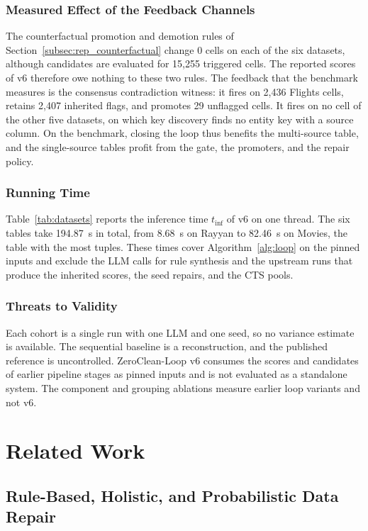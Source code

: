 \documentclass[conference]{IEEEtran}
\begin{document}
\subsubsection{Measured Effect of the Feedback Channels}
The counterfactual promotion and demotion rules of Section~\ref{subsec:rep_counterfactual} change 0 cells on each of the six datasets, although candidates are evaluated for 15,255 triggered cells. The reported scores of v6 therefore owe nothing to these two rules. The feedback that the benchmark measures is the consensus contradiction witness: it fires on 2,436 Flights cells, retains 2,407 inherited flags, and promotes 29 unflagged cells. It fires on no cell of the other five datasets, on which key discovery finds no entity key with a source column. On the benchmark, closing the loop thus benefits the multi-source table, and the single-source tables profit from the gate, the promoters, and the repair policy.

\subsubsection{Running Time}
Table~\ref{tab:datasets} reports the inference time $t_{\mathrm{inf}}$ of v6 on one thread. The six tables take 194.87~s in total, from 8.68~s on Rayyan to 82.46~s on Movies, the table with the most tuples. These times cover Algorithm~\ref{alg:loop} on the pinned inputs and exclude the LLM calls for rule synthesis and the upstream runs that produce the inherited scores, the seed repairs, and the CTS pools.

\subsubsection{Threats to Validity}
Each cohort is a single run with one LLM and one seed, so no variance estimate is available. The sequential baseline is a reconstruction, and the published reference is uncontrolled. ZeroClean-Loop v6 consumes the scores and candidates of earlier pipeline stages as pinned inputs and is not evaluated as a standalone system. The component and grouping ablations measure earlier loop variants and not v6.

\section{Related Work}
\label{sec:related}

\subsection{Rule-Based, Holistic, and Probabilistic Data Repair}
\label{subsec:rel_holistic}
\end{document}
